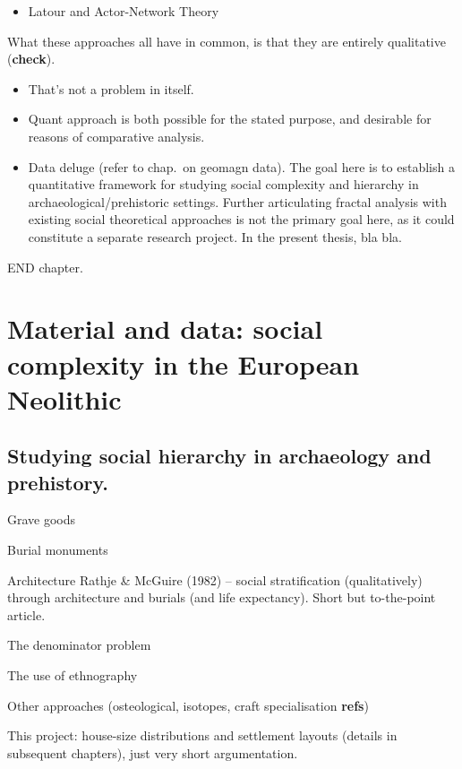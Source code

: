 \documentclass[
  12pt,
]{book}
\providecommand{\tightlist}{%
  \setlength{\itemsep}{0pt}\setlength{\parskip}{0pt}}
\begin{document}
\begin{itemize}
\tightlist
\item
  Latour and Actor-Network Theory
\end{itemize}

What these approaches all have in common, is that they are entirely qualitative (\textbf{check}).

\begin{itemize}
\item
  That's not a problem in itself.
\item
  Quant approach is both possible for the stated purpose, and desirable for reasons of comparative analysis.
\item
  Data deluge (refer to chap.~on geomagn data). The goal here is to establish a quantitative framework for studying social complexity and hierarchy in archaeological/prehistoric settings. Further articulating fractal analysis with existing social theoretical approaches is not the primary goal here, as it could constitute a separate research project. In the present thesis, bla bla.
\end{itemize}

END chapter.

\hypertarget{material}{%
\chapter{Material and data: social complexity in the European Neolithic}\label{material}}

\hypertarget{complexity-archaeo}{%
\section{Studying social hierarchy in archaeology and prehistory.}\label{complexity-archaeo}}

Grave goods

Burial monuments

Architecture Rathje \& McGuire (1982) -- social stratification (qualitatively) through architecture and burials (and life expectancy). Short but to-the-point article.

The denominator problem

The use of ethnography

Other approaches (osteological, isotopes, craft specialisation \textbf{refs})

This project: house-size distributions and settlement layouts (details in subsequent chapters), just very short argumentation.
\end{document}
